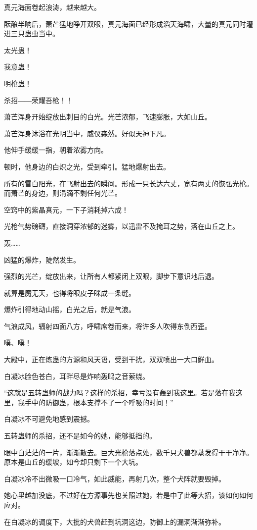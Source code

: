 \begin{this_body}
真元海面卷起浪涛，越来越大。

酝酿半晌后，萧芒猛地睁开双眼，真元海面已经形成滔天海啸，大量的真元同时灌进三只蛊虫当中。

太光蛊！

我意蛊！

明枪蛊！

杀招――荣耀吾枪！！

萧芒浑身开始绽放出刺目的白光。光芒浓郁，飞速膨胀，大如山丘。

萧芒浑身沐浴在光明当中，威仪森然。好似天神下凡。

他伸手缓缓一指，朝着浓雾方向。

顿时，他身边的白炽之光，受到牵引。猛地爆射出去。

所有的雪白阳光，在飞射出去的瞬间。形成一只长达六丈，宽有两丈的恢弘光枪。而萧芒的身边，则涓滴不剩任何光芒。

空窍中的紫晶真元，一下子消耗掉六成！

光枪气势磅礴，直接洞穿浓郁的迷雾，以迅雷不及掩耳之势，落在山丘之上。

轰……

凶猛的爆炸，陡然发生。

强烈的光芒，绽放出来，让所有人都紧闭上双眼，脚步下意识地后退。

就算是魔无天，也得将眼皮子眯成一条缝。

爆炸引得地动山摇，白光之后，就是气浪。

气浪成风，辐射四面八方，呼啸席卷而来，将许多人吹得东倒西歪。

噗、噗！

大殿中，正在炼蛊的方源和风天语，受到干扰，双双喷出一大口鲜血。

白凝冰脸色苍白，耳畔尽是炸响轰鸣之音萦绕。

“这就是五转蛊师的战力吗？这样的杀招，幸亏没有轰到我这里。若是落在我这里，我手中的防御蛊，根本支撑不了一个呼吸的时间！”

白凝冰不可避免地感到震撼。

五转蛊师的杀招，还不是如今的她，能够抵挡的。

眼中白茫茫的一片，渐渐散去。巨大光枪落点处，数千只犬兽都蒸发得干干净净。原本是山丘的缓坡，如今却只剩下一个大坑。

白凝冰冷不出微吸一口冷气，如此威能，再射几次，整个犬阵就要毁掉。

她心里越加没底，不过好在方源事先也关照过她，若是中了此等大招，该如何如何应对。

在白凝冰的调度下，大批的犬兽赶到坑洞这边，防御上的漏洞渐渐弥补。


\end{this_body}
